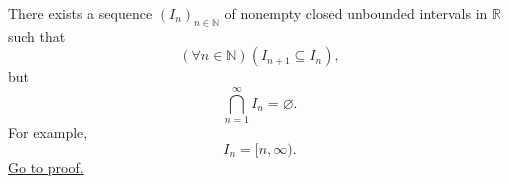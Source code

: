 \begin{proposition}
\label{prop:boundedness-is-necessary-in-nested-interval-theorem}
There exists a sequence $(I_n)_{n\in\mathbb{N}}$ of nonempty closed unbounded
intervals in $\mathbb{R}$ such that
\[
  (\forall n\in\mathbb{N})(I_{n+1}\subseteq I_n),
\]
but
\[
  \bigcap_{n=1}^{\infty}I_n=\varnothing.
\]
For example,
\[
  I_n=[n,\infty).
\]
\hyperref[prf:boundedness-is-necessary-in-nested-interval-theorem]{Go to proof.}
\end{proposition}